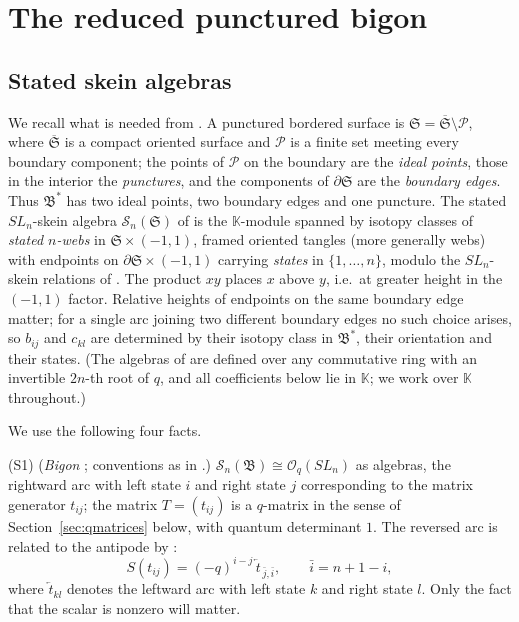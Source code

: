 \documentclass[11pt]{article}
\theoremstyle{remark}
\newcommand{\kk}{\mathbb K}
\newcommand{\Skein}{\mathcal S_n}
\newcommand{\Bstar}{\mathfrak B^*}
\newcommand{\Bigon}{\mathfrak B}
\newcommand{\Oq}{\mathcal O_q(SL_n)}
\begin{document}
\section{The reduced punctured bigon}\label{sec:skein}

\subsection{Stated skein algebras}\label{sec:statedskein}

We recall what is needed from \cite{LS,LY}. A punctured bordered
surface is $\mathfrak S=\overline{\mathfrak S}\setminus\mathcal P$,
where $\overline{\mathfrak S}$ is a compact oriented surface and
$\mathcal P$ is a finite set meeting every boundary component; the
points of $\mathcal P$ on the boundary are the \emph{ideal points},
those in the interior the \emph{punctures}, and the components of
$\partial\mathfrak S$ are the \emph{boundary edges}. Thus $\Bstar$ has
two ideal points, two boundary edges and one puncture. The stated $SL_n$-skein
algebra $\Skein(\mathfrak S)$ of \cite{LS} is the $\kk$-module spanned
by isotopy classes of \emph{stated $n$-webs} in
$\mathfrak S\times(-1,1)$, framed oriented tangles (more generally
webs) with endpoints on $\partial\mathfrak S\times(-1,1)$ carrying
\emph{states} in $\{1,\dots,n\}$, modulo the $SL_n$-skein relations of
\cite{LS}. The product $xy$ places $x$ above $y$, i.e.\ at
greater height in the $(-1,1)$ factor. Relative heights of endpoints on
the same boundary edge matter; for a single arc joining two different
boundary edges no such choice arises, so $b_{ij}$ and $c_{kl}$ are
determined by their isotopy class in $\Bstar$, their orientation and
their states. (The algebras of \cite{LS} are defined over any
commutative ring with an invertible $2n$-th root of $q$, and all
coefficients below lie in $\kk$; we work over $\kk$ throughout.)

We use the following four facts.

\noindent(S1) (\emph{Bigon} \cite[Theorem 6.3]{LS}; conventions as in
\cite[Sections 3.1 and 4.7]{LY}.) $\Skein(\Bigon)\cong\Oq$ as algebras,
the rightward arc with left state $i$ and right state $j$ corresponding
to the matrix generator $t_{ij}$; the matrix $T=(t_{ij})$ is a
$q$-matrix in the sense of Section~\ref{sec:qmatrices} below, with
quantum determinant $1$. The reversed arc is related to the antipode
by \cite[equation (83)]{LY}:
\begin{equation}\label{eq:antipode}
 S(t_{ij})=(-q)^{i-j}\,\overleftarrow{t}_{\,\bar j,\bar i},
 \qquad\bar i=n+1-i,
\end{equation}
where $\overleftarrow t_{kl}$ denotes the leftward arc with left state
$k$ and right state $l$. Only the fact that the scalar is nonzero will
matter.
\end{document}
